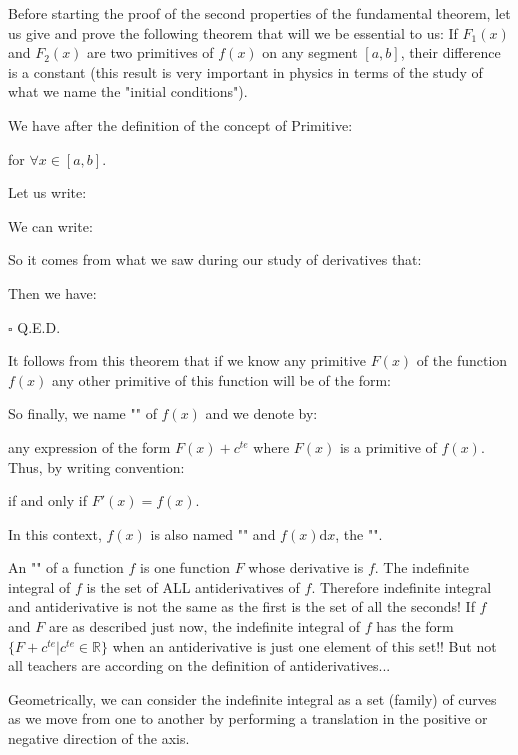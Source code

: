 	Before starting the proof of the second properties of the fundamental theorem, let us give and prove the following theorem that will we be essential to us: If $F_1(x)$ and $F_2(x)$ are two primitives of $f (x)$ on any segment $[a, b]$, their difference is a constant (this result is very important in physics in terms of the study of what we name the "initial conditions").
	\begin{dem}
	We have after the definition of the concept of Primitive:
	
	for $\forall x \in [a,b]$.
	
	Let us write:
	
	We can write:
	
	So it comes from what we saw during our study of derivatives that:
	
	Then we have:
	
	\begin{flushright}
		$\square$  Q.E.D.
	\end{flushright}
	\end{dem}
	It follows from this theorem that if we know any primitive $F (x)$ of the function $f (x)$ any other primitive of this function will be of the form:
	
	So finally, we name "" of $f (x)$ and we denote by:
	
	any expression of the form $F (x)+c^{te}$ where $F(x)$ is a primitive of $f(x)$. Thus, by writing convention:
	
	if and only if $F'(x)=f(x)$.
	
	In this context, $f (x)$ is also named "" and $f (x) \mathrm{d}x$, the "".
	\begin{tcolorbox}[title=Remarks,colframe=black,arc=10pt]
	An "" of a function $f$ is one function $F$ whose derivative is $f$. The indefinite integral of $f$ is the set of ALL antiderivatives of $f$. Therefore indefinite integral and antiderivative is not the same as the first is the set of all the seconds! If $f$ and $F$ are as described just now, the indefinite integral of $f$ has the form $\{F+c^{te}|c^{te}\in\mathbb{R}\}$ when an antiderivative is just one element of this set!! But not all teachers are according on the definition of antiderivatives...
	\end{tcolorbox}
	
	Geometrically, we can consider the indefinite integral as a set (family) of curves as we move from one to another by performing a translation in the positive or negative direction of the axis.
	
